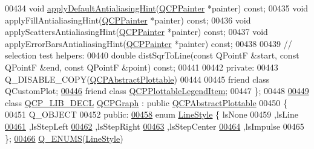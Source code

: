 \begin{DoxyCode}
00434   \textcolor{keywordtype}{void} \hyperlink{a00116_a04062908d31c258aea6a7f9760c8431b}{applyDefaultAntialiasingHint}(\hyperlink{a00047}{QCPPainter} *painter) \textcolor{keyword}{const};
00435   \textcolor{keywordtype}{void} applyFillAntialiasingHint(\hyperlink{a00047}{QCPPainter} *painter) \textcolor{keyword}{const};
00436   \textcolor{keywordtype}{void} applyScattersAntialiasingHint(\hyperlink{a00047}{QCPPainter} *painter) \textcolor{keyword}{const};
00437   \textcolor{keywordtype}{void} applyErrorBarsAntialiasingHint(\hyperlink{a00047}{QCPPainter} *painter) \textcolor{keyword}{const};
00438   
00439   \textcolor{comment}{// selection test helpers:}
00440   \textcolor{keywordtype}{double} distSqrToLine(\textcolor{keyword}{const} QPointF &start, \textcolor{keyword}{const} QPointF &end, \textcolor{keyword}{const} QPointF &point) \textcolor{keyword}{const};
00441 
00442 \textcolor{keyword}{private}:
00443   Q\_DISABLE\_COPY(\hyperlink{a00024}{QCPAbstractPlottable})
00444   
00445   friend class QCustomPlot;
\hypertarget{a00116_source_l00446}{}\hyperlink{a00024_a104c78e91302afd6842a903e472f552f}{00446}   friend class \hyperlink{a00048}{QCPPlottableLegendItem};
00447 \};
00448 
\hypertarget{a00116_source_l00449}{}\hyperlink{a00031}{00449} class \hyperlink{a00116_a5eaab02224a642ded7fb8951e973a02c}{QCP\_LIB\_DECL} \hyperlink{a00031}{QCPGraph} : public \hyperlink{a00024}{QCPAbstractPlottable}
00450 \{
00451   Q\_OBJECT
00452 \textcolor{keyword}{public}:
\hypertarget{a00116_source_l00458}{}\hyperlink{a00031_ad60175cd9b5cac937c5ee685c32c0859aea9591b933733cc7b20786b71e60fa04}{00458}   \textcolor{keyword}{enum} \hyperlink{a00031_ad60175cd9b5cac937c5ee685c32c0859}{LineStyle} \{ lsNone        
00459                   ,lsLine        
\hypertarget{a00116_source_l00461}{}\hyperlink{a00031_ad60175cd9b5cac937c5ee685c32c0859ae10568bda57836487d9dec5eba1d6c6e}{00461}                   ,lsStepLeft    
\hypertarget{a00116_source_l00462}{}\hyperlink{a00031_ad60175cd9b5cac937c5ee685c32c0859a9c37951f7d11aa070100fd16f2935c9e}{00462}                   ,lsStepRight   
\hypertarget{a00116_source_l00463}{}\hyperlink{a00031_ad60175cd9b5cac937c5ee685c32c0859a5adf7b04da215a40a764c21294ea7366}{00463}                   ,lsStepCenter  
\hypertarget{a00116_source_l00464}{}\hyperlink{a00031_ad60175cd9b5cac937c5ee685c32c0859aa3b358b4ae7cca94aceeb8e529c12ebb}{00464}                   ,lsImpulse     
00465                  \};
\hypertarget{a00116_source_l00466}{}\hyperlink{a00031_ac8b22193a7578282b54a8b3f0e96af7f}{00466}   \hyperlink{a00031_ac8b22193a7578282b54a8b3f0e96af7f}{Q\_ENUMS}(\hyperlink{a00031_ad60175cd9b5cac937c5ee685c32c0859}{LineStyle})

\end{DoxyCode}
